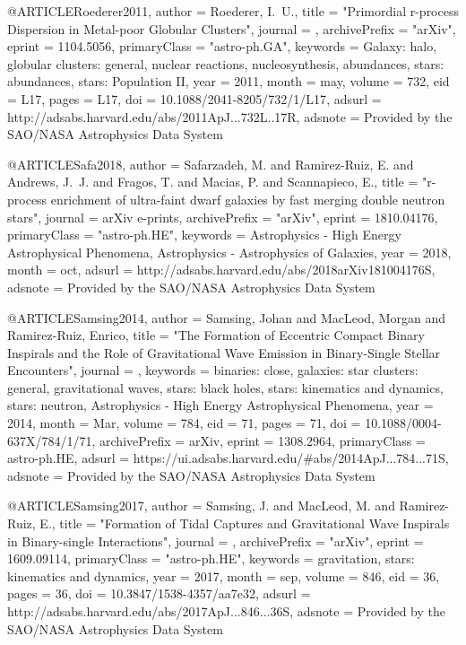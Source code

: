 \documentclass[twocolumn,tighten]{aastex63}
\begin{document}
{{{{{{@ARTICLE{Roederer2011,
   author = {{Roederer}, I.~U.},
    title = "{Primordial r-process Dispersion in Metal-poor Globular Clusters}",
  journal = {\apjl},
archivePrefix = "arXiv",
   eprint = {1104.5056},
 primaryClass = "astro-ph.GA",
 keywords = {Galaxy: halo, globular clusters: general, nuclear reactions, nucleosynthesis, abundances, stars: abundances, stars: Population II},
     year = 2011,
    month = may,
   volume = 732,
      eid = {L17},
    pages = {L17},
      doi = {10.1088/2041-8205/732/1/L17},
   adsurl = {http://adsabs.harvard.edu/abs/2011ApJ...732L..17R},
  adsnote = {Provided by the SAO/NASA Astrophysics Data System}
}

@ARTICLE{Safa2018,
   author = {{Safarzadeh}, M. and {Ramirez-Ruiz}, E. and {Andrews}, J.~J. and 
	{Fragos}, T. and {Macias}, P. and {Scannapieco}, E.},
    title = "{r-process enrichment of ultra-faint dwarf galaxies by fast merging double neutron stars}",
  journal = {arXiv e-prints},
archivePrefix = "arXiv",
   eprint = {1810.04176},
 primaryClass = "astro-ph.HE",
 keywords = {Astrophysics - High Energy Astrophysical Phenomena, Astrophysics - Astrophysics of Galaxies},
     year = 2018,
    month = oct,
   adsurl = {http://adsabs.harvard.edu/abs/2018arXiv181004176S},
  adsnote = {Provided by the SAO/NASA Astrophysics Data System}
}

@ARTICLE{Samsing2014,
       author = {{Samsing}, Johan and {MacLeod}, Morgan and {Ramirez-Ruiz}, Enrico},
        title = "{The Formation of Eccentric Compact Binary Inspirals and the Role of
        Gravitational Wave Emission in Binary-Single Stellar Encounters}",
      journal = {\apj},
     keywords = {binaries: close, galaxies: star clusters: general, gravitational waves,
        stars: black holes, stars: kinematics and dynamics, stars:
        neutron, Astrophysics - High Energy Astrophysical Phenomena},
         year = 2014,
        month = Mar,
       volume = {784},
          eid = {71},
        pages = {71},
          doi = {10.1088/0004-637X/784/1/71},
archivePrefix = {arXiv},
       eprint = {1308.2964},
 primaryClass = {astro-ph.HE},
       adsurl = {https://ui.adsabs.harvard.edu/#abs/2014ApJ...784...71S},
      adsnote = {Provided by the SAO/NASA Astrophysics Data System}
}

@ARTICLE{Samsing2017,
   author = {{Samsing}, J. and {MacLeod}, M. and {Ramirez-Ruiz}, E.},
    title = "{Formation of Tidal Captures and Gravitational Wave Inspirals in Binary-single Interactions}",
  journal = {\apj},
archivePrefix = "arXiv",
   eprint = {1609.09114},
 primaryClass = "astro-ph.HE",
 keywords = {gravitation, stars: kinematics and dynamics},
     year = 2017,
    month = sep,
   volume = 846,
      eid = {36},
    pages = {36},
      doi = {10.3847/1538-4357/aa7e32},
   adsurl = {http://adsabs.harvard.edu/abs/2017ApJ...846...36S},
  adsnote = {Provided by the SAO/NASA Astrophysics Data System}
}

}}}}}}
\end{document}
